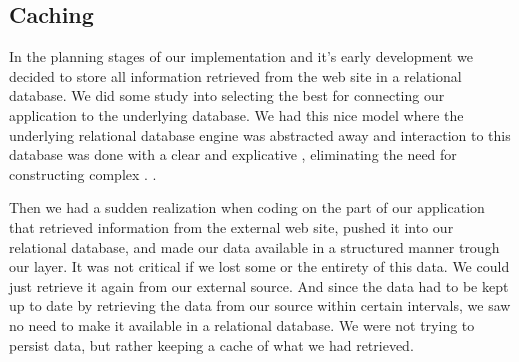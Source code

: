 \subsection{Caching}

In the planning stages of our implementation and it's early development we
decided to store all information retrieved from the \urort{} web site
in a relational database. We did some study into selecting the best
%
for connecting our application to the underlying database. We had this nice
model where the underlying relational database engine was abstracted away
and interaction to this database was done with a clear and explicative
%
,
eliminating the need for constructing complex .%
.

Then we had a sudden realization when coding on the part of our application
that retrieved information from the external \urort{} web site, pushed it into
our relational database, and made our data available in a structured manner
trough our  layer. It was not critical if we lost some or the
entirety of this data. We could just retrieve it again from our external
source. And since the data had to be kept up to date by retrieving the data
from our source within certain intervals, we saw no need to make it available
in a relational database. We were not trying to persist data, but rather
keeping a cache of what we had retrieved.


